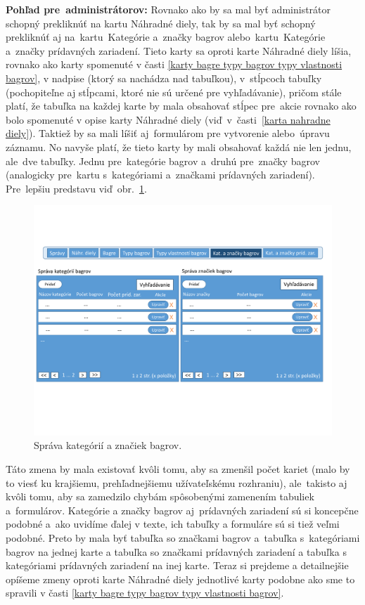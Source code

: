\textbf{Pohľad pre~administrátorov:} Rovnako ako by sa mal byť administrátor schopný prekliknúť na kartu Náhradné diely, tak by sa mal byť schopný prekliknúť aj na~kartu~Kategórie a~značky bagrov alebo~kartu~Kategórie a~značky prídavných zariadení. Tieto karty sa oproti karte Náhradné diely líšia, rovnako ako karty spomenuté v časti \ref{karty bagre typy bagrov typy vlastnosti bagrov}, v nadpise (ktorý sa nachádza nad tabuľkou), v~stĺpcoch tabuľky (pochopiteľne aj stĺpcami, ktoré nie sú určené pre vyhľadávanie), pričom stále platí, že tabuľka na každej karte by mala obsahovať stĺpec pre~akcie rovnako ako bolo spomenuté v opise karty Náhradné diely (viď~v~časti~\ref{karta nahradne diely}). Taktiež by sa mali líšiť aj~formulárom pre vytvorenie alebo~úpravu záznamu. No navyše platí, že tieto karty by mali obsahovať každá nie len jednu, ale~dve tabuľky. Jednu pre~kategórie bagrov a~druhú pre~značky bagrov (analogicky pre~kartu s~kategóriami a~značkami prídavných zariadení). Pre~lepšiu predstavu viď~obr.~\ref{excavator categories and brands management}. 

\begin{figure}[H]\centering
\includegraphics[width=140mm]{../img/UI concept/excavator categories and brands management}
\caption{Správa kategórií a značiek bagrov.}
\label{excavator categories and brands management}
\end{figure}

Táto zmena by mala existovať kvôli tomu, aby sa zmenšil počet kariet (malo by to viesť ku krajšiemu, prehľadnejšiemu užívateľskému rozhraniu), ale~takisto aj kvôli tomu, aby sa zamedzilo chybám spôsobenými zamenením tabuliek a~formulárov. Kategórie a značky bagrov aj~prídavných zariadení sú si koncepčne podobné a~ako uvidíme ďalej v texte, ich tabuľky a formuláre sú si tiež veľmi podobné. Preto by mala byť tabuľka so značkami bagrov a~tabuľka s~kategóriami bagrov na jednej karte a tabuľka so značkami prídavných zariadení a tabuľka s kategóriami prídavných zariadení na inej karte. Teraz si prejdeme a detailnejšie opíšeme zmeny oproti karte Náhradné diely jednotlivé karty podobne ako sme to spravili v časti \ref{karty bagre typy bagrov typy vlastnosti bagrov}.

